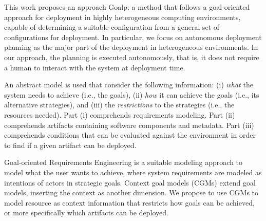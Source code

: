 This work proposes an approach Goalp: a method that follows a goal-oriented approach for deployment in highly heterogeneous computing environments, capable of determining a suitable configuration from a general set of configurations for deployment. In particular, we focus on autonomous deployment planning as the major part of the deployment in heterogeneous environments.
In our approach, the planning is executed autonomously, that is, it does not require a human to interact with the system at deployment time.

An abstract model is used that consider the following information:
(i) \emph{what} the system needs to achieve (i.e., the goals), (ii) \emph{how} it can achieve the goals (i.e., its alternative strategies), and (iii) the \emph{restrictions} to the strategies (i.e., the resources needed).
Part (i) comprehends requirements modeling. Part (ii) comprehends artifacts containing software components and metadata. Part (iii) comprehends conditions that can be evaluated against the environment in order to find if a given artifact can be deployed.

Goal-oriented Requirements Engineering is a suitable modeling approach to model what the user wants to achieve, where system requirements are modeled as intentions of actors in strategic goals\cite{bresciani_tropos:_2004}\cite{dardenne_goal-directed_1993}\cite{yu_modelling_1996}. Context goal models (CGMs) extend goal models\cite{ali_goal-based_2010}, inserting the context as another dimension. We propose to use CGMs to model resource as context information that restricts how goals can be achieved, or more specifically which artifacts can be deployed.




